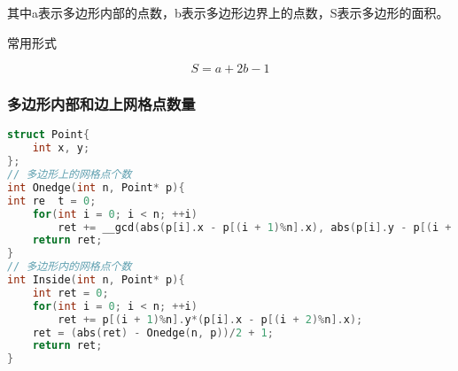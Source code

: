 其中a表示多边形内部的点数，b表示多边形边界上的点数，S表示多边形的面积。

常用形式

$$S = a + 2b - 1$$

\subsubsection{多边形内部和边上网格点数量}

\begin{lstlisting}[language=C++]
struct Point{
    int x, y;
};
// 多边形上的网格点个数
int Onedge(int n, Point* p){
int re  t = 0;
    for(int i = 0; i < n; ++i)
        ret += __gcd(abs(p[i].x - p[(i + 1)%n].x), abs(p[i].y - p[(i + 1)%n].y));
    return ret;
}
// 多边形内的网格点个数
int Inside(int n, Point* p){
    int ret = 0;
    for(int i = 0; i < n; ++i)
        ret += p[(i + 1)%n].y*(p[i].x - p[(i + 2)%n].x);
    ret = (abs(ret) - Onedge(n, p))/2 + 1;
    return ret;
}
\end{lstlisting}
